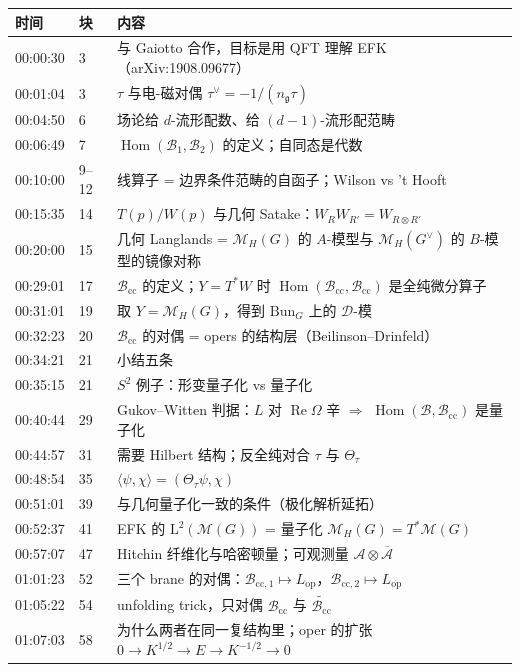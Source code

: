 \documentclass[11pt,a4paper]{ctexart}
\newcommand{\Bcc}{\mathcal{B}_{\mathrm{cc}}}
\newcommand{\Loc}{\mathcal{M}_H}
\newcommand{\Bun}{\mathrm{Bun}_G}
\newcommand{\op}{\mathrm{op}}
\newcommand{\opb}{\overline{\mathrm{op}}}
\newcommand{\Hom}{\operatorname{Hom}}
\begin{document}
\begin{center}\small
\begin{tabular}{@{}llp{9.6cm}@{}}
\toprule
时间 & 块 & 内容\\
\midrule
00:00:30 & 3 & 与 Gaiotto 合作，目标是用 QFT 理解 EFK（arXiv:1908.09677）\\
00:01:04 & 3 & $\tau$ 与电-磁对偶 $\tau^{\vee}=-1/(n_{\mathfrak{g}}\tau)$\\
00:04:50 & 6 & 场论给 $d$-流形配数、给 $(d-1)$-流形配范畴\\
00:06:49 & 7 & $\Hom(\mathcal{B}_1,\mathcal{B}_2)$ 的定义；自同态是代数\\
00:10:00 & 9–12 & 线算子 = 边界条件范畴的自函子；Wilson vs 't Hooft\\
00:15:35 & 14 & $T(p)/W(p)$ 与几何 Satake：$W_RW_{R'}=W_{R\otimes R'}$\\
00:20:00 & 15 & 几何 Langlands = $\Loc(G)$ 的 $A$-模型与 $\Loc(G^{\vee})$ 的 $B$-模型的镜像对称\\
00:29:01 & 17 & $\Bcc$ 的定义；$Y=T^*W$ 时 $\Hom(\Bcc,\Bcc)$ 是全纯微分算子\\
00:31:01 & 19 & 取 $Y=\Loc(G)$，得到 $\Bun$ 上的 $\mathcal{D}$-模\\
00:32:23 & 20 & $\Bcc$ 的对偶 = opers 的结构层（Beilinson–Drinfeld）\\
00:34:21 & 21 & 小结五条\\
00:35:15 & 21 & $S^2$ 例子：形变量子化 vs 量子化\\
00:40:44 & 29 & Gukov–Witten 判据：$L$ 对 $\operatorname{Re}\Omega$ 辛 $\Rightarrow$ $\Hom(\mathcal{B},\Bcc)$ 是量子化\\
00:44:57 & 31 & 需要 Hilbert 结构；反全纯对合 $\tau$ 与 $\Theta_\tau$\\
00:48:54 & 35 & $\langle\psi,\chi\rangle=(\Theta_\tau\psi,\chi)$\\
00:51:01 & 39 & 与几何量子化一致的条件（极化解析延拓）\\
00:52:37 & 41 & EFK 的 $\mathrm{L}^2(\mathcal{M}(G))$ = 量子化 $\Loc(G)=T^*\mathcal{M}(G)$\\
00:57:07 & 47 & Hitchin 纤维化与哈密顿量；可观测量 $\mathcal{A}\otimes\overline{\mathcal{A}}$\\
01:01:23 & 52 & 三个 brane 的对偶：$\mathcal{B}_{\mathrm{cc},1}\mapsto L_{\op}$，$\mathcal{B}_{\mathrm{cc},2}\mapsto L_{\opb}$\\
01:05:22 & 54 & unfolding trick，只对偶 $\Bcc$ 与 $\widetilde{\Bcc}$\\
01:07:03 & 58 & 为什么两者在同一复结构里；oper 的扩张 $0\to K^{1/2}\to E\to K^{-1/2}\to 0$\\

\end{tabular}
\end{center}
\end{document}
